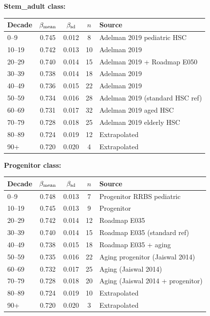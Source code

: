 \documentclass[12pt,a4paper]{article}
\begin{document}
\textbf{Stem\_adult class:}

\begin{center}
\footnotesize
\begin{tabular}{lcccp{4cm}}
\toprule
Decade & $\beta_{\rm mean}$ & $\beta_{\rm sd}$ & $n$ & Source \\
\midrule
0--9   & 0.745 & 0.012 &  8 & Adelman 2019 pediatric HSC \\
10--19 & 0.742 & 0.013 & 10 & Adelman 2019 \\
20--29 & 0.740 & 0.014 & 15 & Adelman 2019 + Roadmap E050 \\
30--39 & 0.738 & 0.014 & 18 & Adelman 2019 \\
40--49 & 0.736 & 0.015 & 22 & Adelman 2019 \\
50--59 & 0.734 & 0.016 & 28 & Adelman 2019 (standard HSC ref) \\
60--69 & 0.731 & 0.017 & 32 & Adelman 2019 aged HSC \\
70--79 & 0.728 & 0.018 & 25 & Adelman 2019 elderly HSC \\
80--89 & 0.724 & 0.019 & 12 & Extrapolated \\
90+    & 0.720 & 0.020 &  4 & Extrapolated \\
\bottomrule
\end{tabular}
\end{center}

\textbf{Progenitor class:}

\begin{center}
\footnotesize
\begin{tabular}{lcccp{4cm}}
\toprule
Decade & $\beta_{\rm mean}$ & $\beta_{\rm sd}$ & $n$ & Source \\
\midrule
0--9   & 0.748 & 0.013 &  7 & Progenitor RRBS pediatric \\
10--19 & 0.745 & 0.013 &  9 & Progenitor \\
20--29 & 0.742 & 0.014 & 12 & Roadmap E035 \\
30--39 & 0.740 & 0.014 & 15 & Roadmap E035 (standard ref) \\
40--49 & 0.738 & 0.015 & 18 & Roadmap E035 + aging \\
50--59 & 0.735 & 0.016 & 22 & Aging progenitor (Jaiswal 2014) \\
60--69 & 0.732 & 0.017 & 25 & Aging (Jaiswal 2014) \\
70--79 & 0.728 & 0.018 & 20 & Aging (Jaiswal 2014 + progenitor) \\
80--89 & 0.724 & 0.019 & 10 & Extrapolated \\
90+    & 0.720 & 0.020 &  3 & Extrapolated \\
\bottomrule
\end{tabular}
\end{center}
\end{document}

